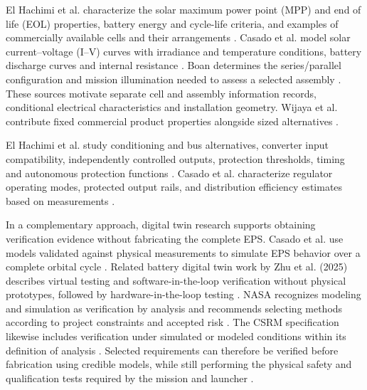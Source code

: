 El Hachimi et al. characterize the solar maximum power point (MPP) and end of life (EOL) properties, battery energy and cycle-life criteria, and examples of commercially available cells and their arrangements \citep[Secs.~3 and~6.2]{handpicked-0003}. Casado et al. model solar current--voltage (I--V) curves with irradiance and temperature conditions, battery discharge curves and internal resistance \citep[Secs.~2.1 and~2.3]{review-0573}. Boan determines the series/parallel configuration and mission illumination needed to assess a selected assembly \citep[Sec.~3]{review-0289}. These sources motivate separate cell and assembly information records, conditional electrical characteristics and installation geometry. Wijaya et al. contribute fixed commercial product properties alongside sized alternatives \citep[Sec.~III.A--B, Appendix]{review-0145}.

El Hachimi et al. study conditioning and bus alternatives, converter input compatibility, independently controlled outputs, protection thresholds, timing and autonomous protection functions \citep[Secs.~4 and~7.1--7.6]{handpicked-0003}. Casado et al. characterize regulator operating modes, protected output rails, and distribution efficiency estimates based on measurements \citep[Secs.~2.2 and~2.4]{review-0573}.

In a complementary approach, digital twin research supports obtaining verification evidence without fabricating the complete EPS.
Casado et al. use models validated against physical measurements to simulate EPS behavior over a complete orbital cycle \citep[Secs.~3--4]{review-0573}.
Related battery digital twin work by Zhu et al. (2025) describes virtual testing and software-in-the-loop verification without physical prototypes, followed by hardware-in-the-loop testing \citep[p.~3]{handpicked-0001}.
NASA recognizes modeling and simulation as verification by analysis and recommends selecting methods according to project constraints and accepted risk \citep[Sec.~5.3.1.2]{nasa2016systems}.
The CSRM specification likewise includes verification under simulated or modeled conditions within its definition of analysis \citep[Sec.~6.6.8]{omg2025csrm}.
Selected requirements can therefore be verified before fabrication using credible models, while still performing the physical safety and qualification tests required by the mission and launcher \citep[Sec.~5.3.1.2]{nasa2016systems}\citep[Secs.~2.3 and~3]{calpoly2022cds}.


